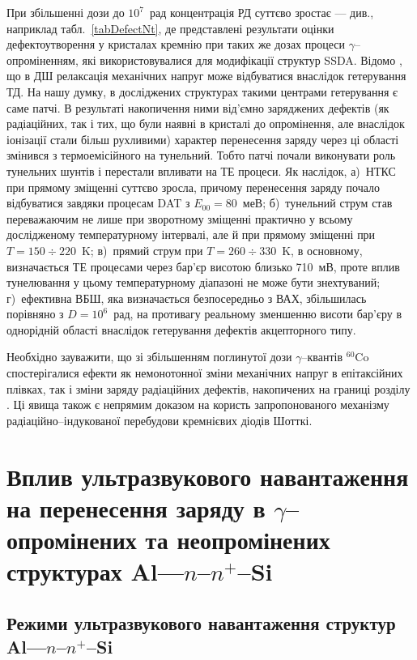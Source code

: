 При збільшенні дози до $10^7$~рад концентрація РД суттєво зростає --- див., наприклад табл.~\ref{tabDefectNt}, де представлені результати оцінки дефектоутворення
у кристалах кремнію при таких же дозах процеси $\gamma$--опроміненням, які використовувалися для модифікації
структур SSDA.
Відомо \cite{Boltovets}, що в ДШ релаксація механічних напруг може відбуватися внаслідок гетерування ТД.
На нашу думку, в досліджених структурах такими центрами гетерування є саме патчі.
В результаті накопичення ними від'ємно заряджених дефектів (як радіаційних, так і тих, що були наявні в кристалі до опромінення, але внаслідок іонізації
стали більш рухливими) характер перенесення заряду через ці області змінився з термоемісійного на тунельний.
Тобто патчі почали виконувати роль тунельних шунтів і перестали впливати на ТЕ процеси.
Як наслідок,
а)~НТКС при прямому зміщенні суттєво зросла, причому перенесення заряду почало відбуватися завдяки процесам DAT з $E_{00}=80$~меВ;
б)~тунельний струм став переважаючим не лише при зворотному зміщенні практично у всьому дослідженому температурному інтервалі,
але й при прямому зміщенні при $T=150\div220$~K;
в)~прямий струм при $T=260\div330$~K, в основному, визначається ТЕ процесами через бар'єр висотою близько 710~мВ,
проте вплив тунелювання у цьому температурному діапазоні не може бути знехтуваний;
г)~ефективна ВБШ, яка визначається безпосередньо з ВАХ, збільшилась порівняно з  $D=10^6$~рад, на противагу реальному зменшенню висоти бар'єру в однорідній області внаслідок гетерування дефектів акцепторного типу.

Необхідно зауважити, що зі збільшенням поглинутої дози $\gamma$--квантів $^{60}$Co спостерігалися ефекти як немонотонної зміни механічних напруг
в епітаксійних плівках, так і зміни заряду радіаційних дефектів, накопичених на границі розділу \cite{Muzafarova, Belyaev}.
Ці явища також є непрямим доказом на користь запропонованого механізму радіаційно--індукованої перебудови кремнієвих діодів Шотткі.



\section{Вплив ультразвукового навантаження на перенесення заряду в $\gamma$--опромінених та неопромінених структурах Al---$n$--$n^+$--Si\label{MSSi_USL}}

\subsection{Режими ультразвукового навантаження структур Al---$n$--$n^+$--Si}

